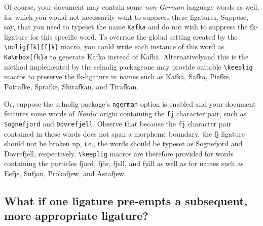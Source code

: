 \documentclass[12pt]{article}
\newcommand{\pkg}[1]{\textsf{#1}}
\newcommand{\opt}[1]{\texttt{#1}}
\newcommand{\cmmd}[1]{\texttt{\textbackslash #1}}
\begin{document}
Of course, your document may contain some \emph{non-German} language words as well, for which you would not necessarily want to suppress these ligatures. Suppose, say, that you need to typeset the name \opt{Kafka} and do not wish to suppress the {\ebg \mbox{fk}}-ligature for this specific word. To override the global setting created by the \Verb+\nolig{fk}{f|k}+ macro, you could write each instance of this word as 
\Verb+Ka\mbox{fk}a+
to generate Ka\mbox{\ebg \mbox{fk}}a instead of Kafka. Alternatively\textemdash and this is the method implemented by the \pkg{selnolig} package\textemdash one may provide suitable \cmmd{keeplig} macros to preserve the {\ebg\mbox{fk}}-ligature in names such as {\ebg Kafka, Safka, Piefke, Potrafke, Sprafke, Shirafkan, and Tirafkan}. 



Or, suppose the \pkg{selnolig} package's \opt{ngerman} option is enabled and your document features some words of \emph{Nordic} origin containing the \opt{fj} character pair, such as \opt{Sognefjord} and \opt{Dovrefjell}. Observe that because the \opt{fj} character pair contained in these words does not span a morpheme boundary, the \mbox{fj}-ligature should not be broken up, i.e., the words should be typeset as Sognefjord and Dovrefjell, respectively.  \cmmd{keeplig} macros are therefore provided for words containing the particles fjord, fjör, fjell, and fjäll as well as for names such as Eefje, Sufjan, Prokofjew, and Astafjew.



\subsection{What if one ligature pre-empts a subsequent, more appropriate ligature?} \label{sec:preempt}
\end{document}
